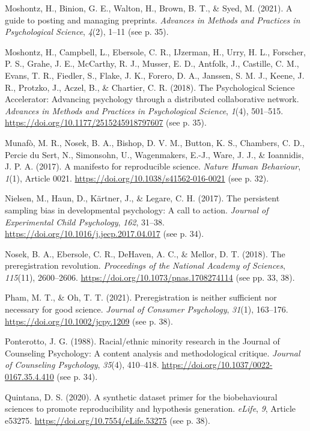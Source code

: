 \documentclass[authordate, empirical,issue]{jote-new-article}
\begin{document}
Moshontz, H., Binion, G. E., Walton, H., Brown, B. T., \& Syed, M. (2021). A guide to posting and managing preprints. \emph{Advances in Methods and Practices in Psychological Science}, \emph{4}(2), 1–11 (see p. 35).

Moshontz, H., Campbell, L., Ebersole, C. R., IJzerman, H., Urry, H. L., Forscher, P. S., Grahe, J. E., McCarthy, R. J., Musser, E. D., Antfolk, J., Castille, C. M., Evans, T. R., Fiedler, S., Flake, J. K., Forero, D. A., Janssen, S. M. J., Keene, J. R., Protzko, J., Aczel, B., \& Chartier, C. R. (2018). The Psychological Science Accelerator: Advancing psychology through a distributed collaborative network. \emph{Advances in Methods and Practices in Psychological Science}, \emph{1}(4), 501–515. \url{https://doi.org/10.1177/2515245918797607} (see p. 35).

Munafò, M. R., Nosek, B. A., Bishop, D. V. M., Button, K. S., Chambers, C. D., Percie du Sert, N., Simonsohn, U., Wagenmakers, E.-J., Ware, J. J., \& Ioannidis, J. P. A. (2017). A manifesto for reproducible science. \emph{Nature Human Behaviour}, \emph{1}(1), Article 0021. \url{https://doi.org/10.1038/s41562-016-0021} (see p. 32). 

Nielsen, M., Haun, D., Kärtner, J., \& Legare, C. H. (2017). The persistent sampling bias in developmental psychology: A call to action. \emph{Journal of Experimental Child Psychology}, \emph{162}, 31–38. \url{https://doi.org/10.1016/j.jecp.2017.04.017} (see p. 34).

Nosek, B. A., Ebersole, C. R., DeHaven, A. C., \& Mellor, D. T. (2018). The preregistration revolution. \emph{Proceedings of the National Academy of Sciences}, \emph{115}(11), 2600–2606. \url{https://doi.org/10.1073/pnas.1708274114} (see pp. 33, 38).

Pham, M. T., \& Oh, T. T. (2021). Preregistration is neither sufficient nor necessary for good science. \emph{Journal of Consumer Psychology}, \emph{31}(1), 163–176. \url{https://doi.org/10.1002/jcpy.1209} (see p. 38).

Ponterotto, J. G. (1988). Racial/ethnic minority research in the Journal of Counseling Psychology: A content analysis and methodological critique. \emph{Journal of Counseling Psychology}, \emph{35}(4), 410–418. \url{https://doi.org/10.1037/0022-0167.35.4.410} (see p. 34).

Quintana, D. S. (2020). A synthetic dataset primer for the biobehavioural sciences to promote reproducibility and hypothesis generation. \emph{eLife}, \emph{9}, Article e53275. \url{https://doi.org/10.7554/eLife.53275} (see p. 38).
\end{document}
